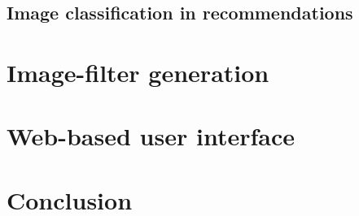 \documentclass[a4paper,12pt]{article}
\begin{document}
  \subsection{Image classification in recommendations}

\section{Image-filter generation}

\section{Web-based user interface}

\section{Conclusion}

\singlespacing



\end{document}
